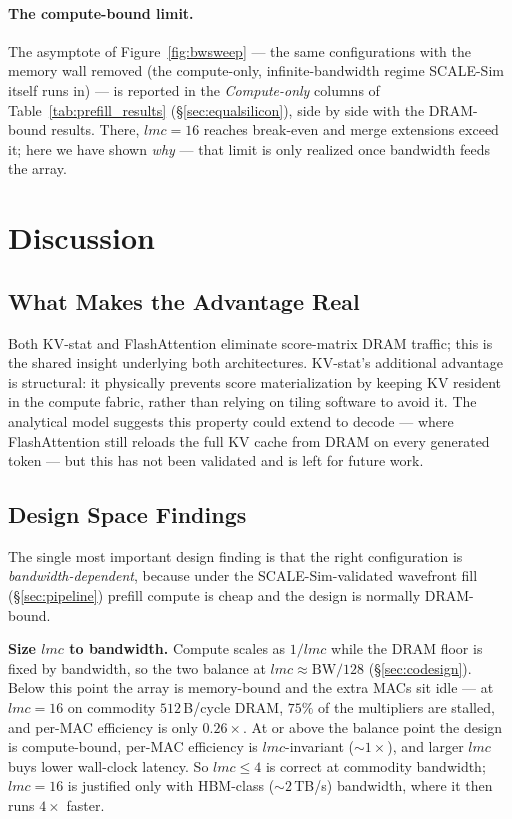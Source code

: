 \documentclass[11pt]{article}
\begin{document}
\paragraph{The compute-bound limit.}
The asymptote of Figure~\ref{fig:bwsweep} --- the same configurations with the
memory wall removed (the compute-only, infinite-bandwidth regime SCALE-Sim itself
runs in) --- is reported in the \emph{Compute-only} columns of
Table~\ref{tab:prefill_results} (\S\ref{sec:equalsilicon}), side by side with the
DRAM-bound results. There, \(lmc = 16\) reaches break-even and merge extensions
exceed it; here we have shown \emph{why} --- that limit is only realized once
bandwidth feeds the array.

\section{Discussion}

\subsection{What Makes the Advantage Real}

Both KV-stat and FlashAttention eliminate score-matrix DRAM traffic;
this is the shared insight underlying both architectures.
KV-stat's additional advantage is structural: it physically
prevents score materialization by keeping KV resident in the
compute fabric, rather than relying on tiling software to avoid it.
The analytical model suggests this property could extend to decode
--- where FlashAttention still reloads the full KV cache from DRAM
on every generated token --- but this has not been validated and
is left for future work.

\subsection{Design Space Findings}
\label{sec:findings}

The single most important design finding is that the right
configuration is \emph{bandwidth-dependent}, because under the
SCALE-Sim-validated wavefront fill (\S\ref{sec:pipeline}) prefill
compute is cheap and the design is normally DRAM-bound.

\textbf{Size \(lmc\) to bandwidth.}
Compute scales as \(1/lmc\) while the DRAM floor is fixed by bandwidth,
so the two balance at \(lmc \approx \text{BW}/128\) (\S\ref{sec:codesign}).
Below this point the array is memory-bound and the extra MACs sit idle
--- at \(lmc = 16\) on commodity \(512\,\)B/cycle DRAM, \(75\%\) of the
multipliers are stalled, and per-MAC efficiency is only \(0.26\times\).
At or above the balance point the design is compute-bound, per-MAC
efficiency is \(lmc\)-invariant (\(\sim\!1\times\)), and larger \(lmc\)
buys lower wall-clock latency. So \(lmc \le 4\) is correct at commodity
bandwidth; \(lmc = 16\) is justified only with HBM-class
(\(\sim\!2\,\)TB/s) bandwidth, where it then runs \(4\times\) faster.
\end{document}
